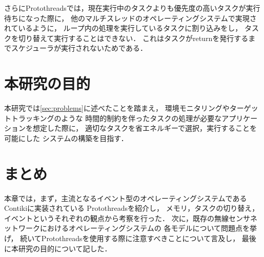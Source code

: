 
さらにProtothreadsでは，現在実行中のタスクよりも優先度の高いタスクが実行待ちになった際に，
他のマルチスレッドのオペレーティングシステムで実現されているように，
ループ内の処理を実行しているタスクに割り込みをし，
タスクを切り替えて実行することはできない．
これはタスクがreturnを発行するまでスケジューラが実行されないためである．


\section{本研究の目的}\label{sec:objective}
本研究では\ref{sec:problems}に述べたことを踏まえ，
環境モニタリングやターゲットトラッキングのような
時間的制約を伴ったタスクの処理が必要なアプリケーションを想定した際に，
適切なタスクを省エネルギーで選択，実行することを可能にした
システムの構築を目指す．


\section{まとめ}


本章では，まず，主流となるイベント型のオペレーティングシステムであるContikiに実装されている
Protothreadsを紹介し，
メモリ，タスクの切り替え，イベントというそれぞれの観点から考察を行った．
次に，既存の無線センサネットワークにおけるオペレーティングシステムの
各モデルについて問題点を挙げ，
続いてProtothreadsを使用する際に注意すべきことについて言及し，
最後に本研究の目的について記した．









